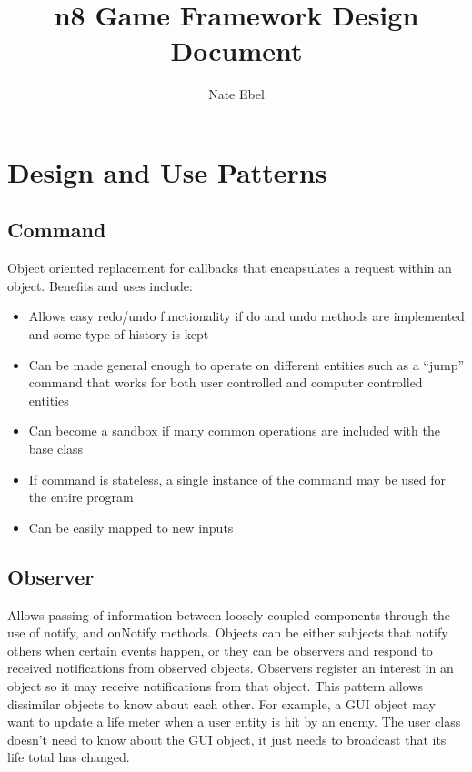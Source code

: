 \documentclass[12pt]{article}
\begin{document}
\title{n8 Game Framework Design Document}
\author{Nate Ebel}

\maketitle

\tableofcontents
\pagebreak

\section{Design and Use Patterns}
\subsection{Command}
Object oriented replacement for callbacks that encapsulates a request within an object.  Benefits and uses include:
\begin{itemize}
	\item Allows easy redo/undo functionality if do and undo methods are implemented and some type of history is kept
	\item Can be made general enough to operate on different entities such as a ``jump'' command that works for both user controlled and computer controlled entities
	\item Can become a sandbox if many common operations are included with the base class
	\item If command is stateless, a single instance of the command may be used for the entire program
	\item Can be easily mapped to new inputs
\end{itemize}

\subsection{Observer}
Allows passing of information between loosely coupled components through the use of notify, and onNotify methods.  Objects can be either subjects that notify others when certain events happen, or they can be observers and respond to received notifications from observed objects.  Observers register an interest in an object so it may receive notifications from that object.  This pattern allows dissimilar objects to know about each other.  For example, a GUI object may want to update a life meter when a user entity is hit by an enemy.  The user class doesn't need to know about the GUI object, it just needs to broadcast that its life total has changed.
\end{document}
